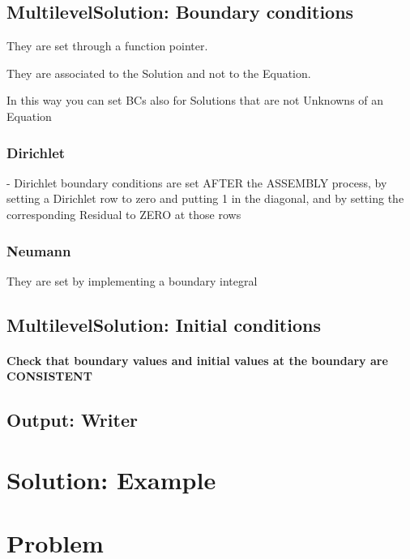 \documentclass[10pt]{book}
\begin{document}
     

     
  \section{MultilevelSolution: Boundary conditions}

  
  They are set through a function pointer.
  
  They are associated to the Solution and not to the Equation.
  
  In this way you can set BCs also for Solutions that are not Unknowns of an Equation

   \subsection{Dirichlet}
  
  -  Dirichlet boundary conditions are set AFTER the ASSEMBLY process,
     by setting a Dirichlet row to zero and putting 1 in the diagonal,
     and by setting the corresponding Residual to ZERO at those rows
  
   \subsection{Neumann}
   
    They are set by implementing a boundary integral
    
    
    
  
  
  \section{MultilevelSolution: Initial conditions}
  
  \subsubsection{Check that boundary values and initial values at the boundary are CONSISTENT}

  
  \section{Output: Writer}

  
 \chapter{Solution: Example}
  
  
  \chapter{Problem}
\end{document}
